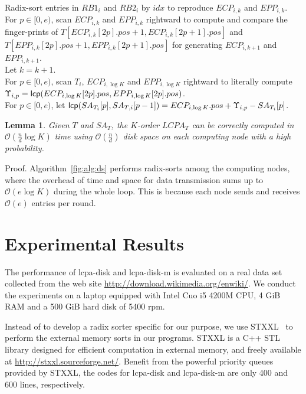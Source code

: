 \documentclass{llncs}
\newtheorem{lem}{Lemma}
\begin{document}
\begin{algorithm}[hbtp!]
{{Radix-sort entries in $RB1_i$ and $RB2_i$ by $idx$ to reproduce $ECP_{i,k}$ and $EPP_{i,k}$. \\
For $p\in [0,e)$, scan $ECP_{i,k}$ and $EPP_{i,k}$ rightward to compute and compare the finger-prints of $T[ECP_{i,k}[2p].pos+1, ECP_{i,k}[2p+1].pos]$ and $T[EPP_{i,k}[2p].pos+1, EPP_{i,k}[2p+1].pos]$ for generating $ECP_{i,k+1}$ and $EPP_{i,k+1}$. \\
Let $k=k+1$. \\
}
For $p\in [0,e)$, scan $T_i$, $ECP_{i,\log K}$ and $EPP_{i,\log K}$ rightward to literally compute $\Upsilon_{i,p}={\sf lcp}(ECP_{i,\log K}[2p].pos,EPP_{i,\log K}[2p].pos)$. \\
For $p\in [0,e)$, let ${\sf lcp}(SA_{T_i}[p],SA_{T,i}[p-1])=ECP_{i,\log K}.pos + \Upsilon_{i,p} - SA_{T_i}[p]$. \\
}
\end{algorithm}

\begin{lem}
\label{thm:lcp:pdm}
Given $T$ and $SA_T$, the $K$-order $LCPA_T$ can be correctly computed in $\mathcal{O}(\frac{n}{d}\log K)$ time using $\mathcal{O}(\frac{n}{d})$ disk space on each computing node with a high probability.
\end{lem}
Proof. Algorithm~\ref{fig:alg:ds} performs radix-sorts among the computing nodes, where the overhead of time and space for data transmission sums up to $\mathcal{O}(e\log K)$ during the whole loop. This is because each node sends and receives $\mathcal{O}(e)$ entries per round.



\section{Experimental Results}\label{sec:experimental_results}

The performance of lcpa-disk and lcpa-disk-m is evaluated on a real data set collected from the web site \url{http://download.wikimedia.org/enwiki/}. We conduct the experiments on a laptop equipped with Intel Cuo i5 4200M CPU, 4 GiB RAM and a 500 GiB hard disk of 5400 rpm.

Instead of to develop a radix sorter specific for our purpose, we use STXXL~\cite{Dementiev2007} to perform the external memory sorts in our programs. STXXL is a {C++} STL library designed for efficient computation in external memory, and freely available at \url{http://stxxl.sourceforge.net/}. Benefit from the powerful priority queues provided by STXXL, the codes for lcpa-disk and lcpa-disk-m are only 400 and 600 lines, respectively.
\end{document}
